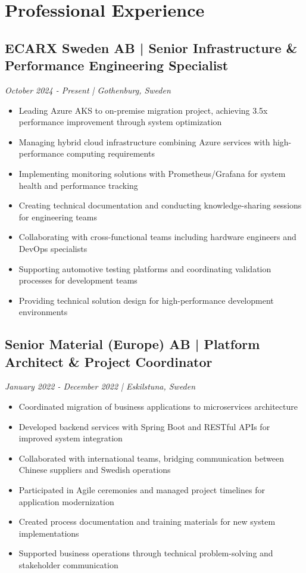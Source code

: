 \documentclass[11pt,a4paper]{article}
\begin{document}
\section*{Professional Experience}
\subsection*{ECARX Sweden AB | Senior Infrastructure \& Performance Engineering Specialist}
\textit{October 2024 - Present | Gothenburg, Sweden}
\begin{itemize}[noitemsep]
\item Leading Azure AKS to on-premise migration project, achieving 3.5x performance improvement through system optimization
\item Managing hybrid cloud infrastructure combining Azure services with high-performance computing requirements
\item Implementing monitoring solutions with Prometheus/Grafana for system health and performance tracking
\item Creating technical documentation and conducting knowledge-sharing sessions for engineering teams
\item Collaborating with cross-functional teams including hardware engineers and DevOps specialists
\item Supporting automotive testing platforms and coordinating validation processes for development teams
\item Providing technical solution design for high-performance development environments
\end{itemize}

\subsection*{Senior Material (Europe) AB | Platform Architect \& Project Coordinator}
\textit{January 2022 - December 2022 | Eskilstuna, Sweden}
\begin{itemize}[noitemsep]
\item Coordinated migration of business applications to microservices architecture
\item Developed backend services with Spring Boot and RESTful APIs for improved system integration
\item Collaborated with international teams, bridging communication between Chinese suppliers and Swedish operations
\item Participated in Agile ceremonies and managed project timelines for application modernization
\item Created process documentation and training materials for new system implementations
\item Supported business operations through technical problem-solving and stakeholder communication
\end{itemize}
\end{document}
